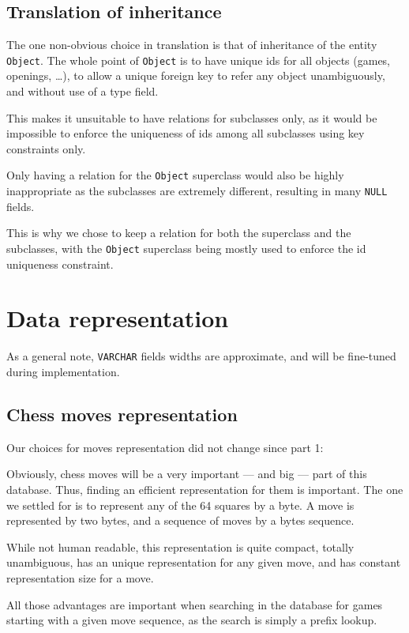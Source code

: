 \documentclass{article}
\begin{document}
\subsection{Translation of inheritance}
The one non-obvious choice in translation is that of inheritance of the entity \verb|Object|.
The whole point of \verb|Object| is to have unique ids for all objects (games, openings, \dots),
to allow a unique foreign key to refer any object unambiguously, and without use of a type field.

This makes it unsuitable to have relations for subclasses only, as it would be impossible to
enforce the uniqueness of ids among all subclasses using key constraints only.

Only having a relation for the \verb|Object| superclass would also be highly inappropriate
as the subclasses are extremely different, resulting in many \verb|NULL| fields.

This is why we chose to keep a relation for both the superclass and the subclasses, with the \verb|Object| superclass
being mostly used to enforce the id uniqueness constraint.


\section{Data representation}
As a general note, \verb|VARCHAR| fields widths are approximate, and will be fine-tuned during implementation.

\subsection{Chess moves representation}
Our choices for moves representation did not change since part 1:

Obviously, chess moves will be a very important --- and big --- part of this database.
Thus, finding an efficient representation for them is important.
The one we settled for is to represent any of the 64 squares by a byte.
A move is represented by two bytes, and a sequence of moves by a bytes sequence.

While not human readable, this representation is quite compact, totally unambiguous,
has an unique representation for any given move, and has constant representation
size for a move.

All those advantages are important when searching in the database for games starting
with a given move sequence, as the search is simply a prefix lookup.
\end{document}
